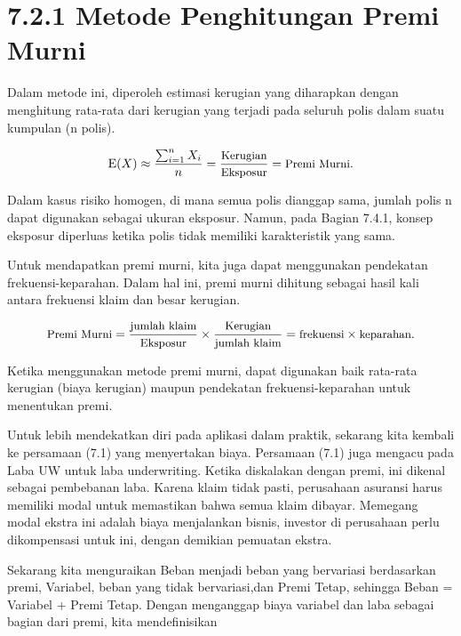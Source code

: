 \documentclass[
]{book}
\begin{document}
\hypertarget{metode-penghitungan-premi-murni}{%
\section{7.2.1 Metode Penghitungan Premi Murni}\label{metode-penghitungan-premi-murni}}

Dalam metode ini, diperoleh estimasi kerugian yang diharapkan dengan menghitung rata-rata dari kerugian yang terjadi pada seluruh polis dalam suatu kumpulan (n polis).

\begin{equation}
\small{
\mathrm{E}(X) \approx \frac{\sum_{i=1}^n X_i}{n} = \frac{\text{Kerugian}}{\text{Eksposur}} = \text{Premi Murni}.
}
\end{equation}

Dalam kasus risiko homogen, di mana semua polis dianggap sama, jumlah polis n dapat digunakan sebagai ukuran eksposur. Namun, pada Bagian 7.4.1, konsep eksposur diperluas ketika polis tidak memiliki karakteristik yang sama.

Untuk mendapatkan premi murni, kita juga dapat menggunakan pendekatan frekuensi-keparahan. Dalam hal ini, premi murni dihitung sebagai hasil kali antara frekuensi klaim dan besar kerugian.

\begin{equation}
\small{
\text{Premi Murni} = \frac{\text{jumlah klaim}}{\text{Eksposur}} \times \frac{\text{Kerugian}}{\text{jumlah klaim}} = \text{frekuensi} \times \text{keparahan}.
}
\end{equation}

Ketika menggunakan metode premi murni, dapat digunakan baik rata-rata kerugian (biaya kerugian) maupun pendekatan frekuensi-keparahan untuk menentukan premi.

Untuk lebih mendekatkan diri pada aplikasi dalam praktik, sekarang kita kembali ke persamaan (7.1) yang menyertakan biaya. Persamaan (7.1) juga mengacu pada Laba UW untuk laba underwriting. Ketika diskalakan dengan premi, ini dikenal sebagai pembebanan laba. Karena klaim tidak pasti, perusahaan asuransi harus memiliki modal untuk memastikan bahwa semua klaim dibayar. Memegang modal ekstra ini adalah biaya menjalankan bisnis, investor di perusahaan perlu dikompensasi untuk ini, dengan demikian pemuatan ekstra.

Sekarang kita menguraikan Beban menjadi beban yang bervariasi berdasarkan premi, Variabel, beban yang tidak bervariasi,dan Premi Tetap, sehingga Beban = Variabel + Premi Tetap. Dengan menganggap biaya variabel dan laba sebagai bagian dari premi, kita mendefinisikan
\end{document}
